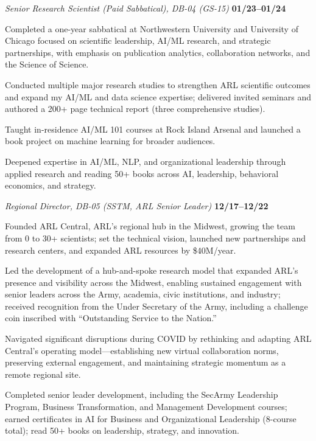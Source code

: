 \begin{list1}
\vspace*{.15in}
\item[] {\em Senior Research Scientist (Paid Sabbatical), DB-04 (GS-15)} \hfill    {\bf {01/23--01/24}}

\begin{list2}
\vspace*{.05in}
\item[\textrightarrow] Completed a one-year sabbatical at Northwestern University and University of Chicago focused on scientific leadership, AI/ML research, and strategic partnerships, with emphasis on publication analytics, collaboration networks, and the Science of Science.
\item[\textrightarrow] Conducted multiple major research studies to strengthen ARL scientific outcomes and expand my AI/ML and data science expertise;  delivered invited seminars and authored a 200+ page technical report (three comprehensive studies).
\item[\textrightarrow] Taught in-residence AI/ML 101 courses at Rock Island Arsenal and launched a book project on machine learning for broader audiences.
\item[\textrightarrow] Deepened expertise in AI/ML, NLP, and organizational leadership through applied research and reading 50+ books across AI, leadership, behavioral economics, and strategy.
\end{list2}

\vspace*{.15in}
\item[] {\em Regional Director, DB-05 (SSTM, ARL Senior Leader)} \hfill {\bf {12/17--12/22}}

\begin{list2}
\vspace*{.05in}
\item[\textrightarrow] Founded ARL Central, ARL’s regional hub in the Midwest, growing the team from 0 to 30+ scientists; set the technical vision, launched new partnerships and research centers, and expanded ARL resources by \$40M/year.
\item[\textrightarrow] Led the development of a hub-and-spoke research model that expanded ARL's presence and visibility across the Midwest, enabling sustained engagement with senior leaders across the Army, academia, civic institutions, and industry; received recognition from the Under Secretary of the Army, including a challenge coin inscribed with ``Outstanding Service to the Nation.''
\item[\textrightarrow] Navigated significant disruptions during COVID by rethinking and adapting ARL Central's operating model---establishing new virtual collaboration norms, preserving external engagement, and maintaining strategic momentum as a remote regional site.
\item[\textrightarrow] Completed senior leader development, including the SecArmy Leadership Program, Business Transformation, and Management Development courses; earned certificates in AI for Business and Organizational Leadership (8-course total); read 50+ books on leadership, strategy, and innovation.
\end{list2}


\end{list1}
